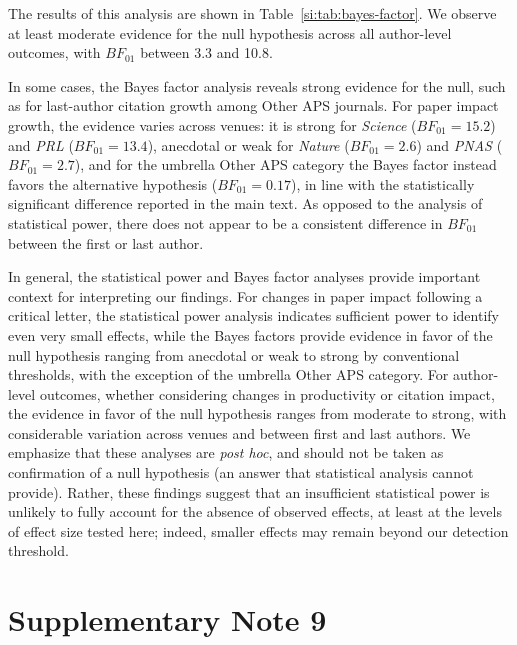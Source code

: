 \documentclass[12pt]{article} %
\begin{document}
The results of this analysis are shown in Table~\ref{si:tab:bayes-factor}. 
We observe at least moderate evidence for the null hypothesis across all author-level outcomes, with $BF_{01}$ between 3.3 and 10.8.

In some cases, the Bayes factor analysis reveals strong evidence for the null, such as for last-author citation growth among Other APS journals.
For paper impact growth, the evidence varies across venues: it is strong for \textit{Science} ($BF_{01} = 15.2$) and \textit{PRL} ($BF_{01} = 13.4$), anecdotal or weak for \textit{Nature} ($BF_{01} = 2.6$) and \textit{PNAS} ($BF_{01} = 2.7$), and for the umbrella Other APS category the Bayes factor instead favors the alternative hypothesis ($BF_{01} = 0.17$), in line with the statistically significant difference reported in the main text.
As opposed to the analysis of statistical power, there does not appear to be a consistent difference in $BF_{01}$ between the first or last author. 

In general, the statistical power and Bayes factor analyses provide important context for interpreting our findings. 
For changes in paper impact following a critical letter, the statistical power analysis indicates sufficient power to identify even very small effects, while the Bayes factors provide evidence in favor of the null hypothesis ranging from anecdotal or weak to strong by conventional thresholds, with the exception of the umbrella Other APS category. 
For author-level outcomes, whether considering changes in productivity or citation impact, the evidence in favor of the null hypothesis ranges from moderate to strong, with considerable variation across venues and between first and last authors.
We emphasize that these analyses are \textit{post hoc}, and should not be taken as confirmation of a null hypothesis (an answer that statistical analysis cannot provide).
Rather, these findings suggest that an insufficient statistical power is unlikely to fully account for the absence of observed effects, at least at the levels of effect size tested here; indeed, smaller effects may remain beyond our detection threshold. 

\section*{Supplementary Note 9}
\label{si:text:statistical-assumptions}
\end{document}
